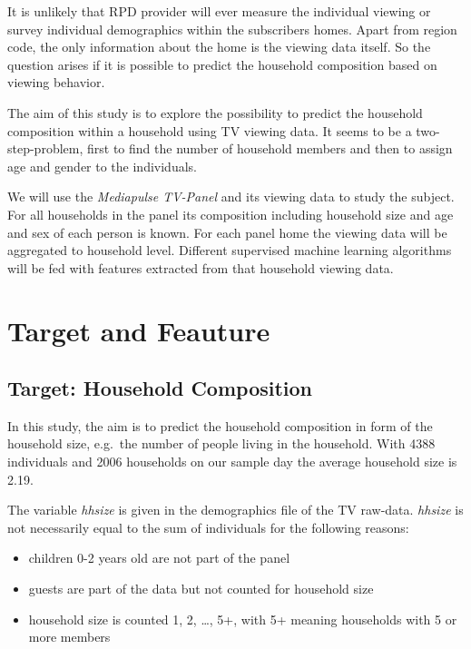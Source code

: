 \documentclass[]{article}
\providecommand{\tightlist}{%
  \setlength{\itemsep}{0pt}\setlength{\parskip}{0pt}}
\begin{document}
It is unlikely that RPD provider will ever measure the individual
viewing or survey individual demographics within the subscribers homes.
Apart from region code, the only information about the home is the
viewing data itself. So the question arises if it is possible to predict
the household composition based on viewing behavior.

The aim of this study is to explore the possibility to predict the
household composition within a household using TV viewing data. It seems
to be a two-step-problem, first to find the number of household members
and then to assign age and gender to the individuals.

We will use the \emph{Mediapulse TV-Panel} and its viewing data to study
the subject. For all households in the panel its composition including
household size and age and sex of each person is known. For each panel
home the viewing data will be aggregated to household level. Different
supervised machine learning algorithms will be fed with features
extracted from that household viewing data.

\section{Target and Feauture}\label{target-and-feauture}

\subsection{Target: Household
Composition}\label{target-household-composition}

In this study, the aim is to predict the household composition in form
of the household size, e.g.~the number of people living in the
household. With 4388 individuals and 2006 households on our sample day
the average household size is 2.19.

The variable \emph{hhsize} is given in the demographics file of the TV
raw-data. \emph{hhsize} is not necessarily equal to the sum of
individuals for the following reasons:

\begin{itemize}
\tightlist
\item
  children 0-2 years old are not part of the panel
\item
  guests are part of the data but not counted for household size
\item
  household size is counted 1, 2, \ldots{}, 5+, with 5+ meaning
  households with 5 or more members
\end{itemize}
\end{document}
